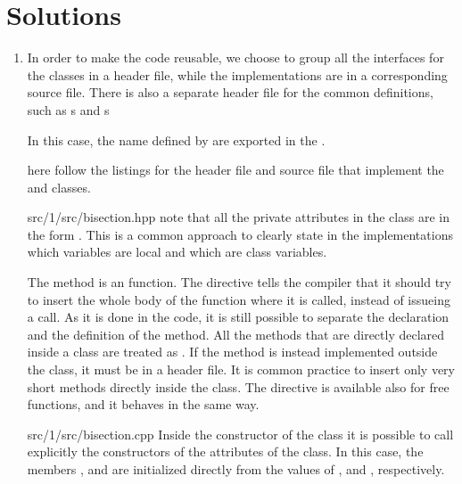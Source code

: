 \section*{Solutions}

\begin{enumerate}

    \item In order to make the code reusable, we choose to group all the
    interfaces for the classes in a header file, while the implementations are
    in a corresponding source file. There is also a separate header file for
    the common definitions, such as s and s

    \lstset{basicstyle=\scriptsize\sf}
    
    \lstset{basicstyle=\sf}

    In this case, the name defined by  are exported in the
     .

    here follow the listings for the header file and source file that implement
    the  and  classes.
    \lstset{basicstyle=\scriptsize\sf}
    
      {src/1/src/bisection.hpp}
    \lstset{basicstyle=\sf}
    note that all the private attributes in the class are in the form
    . This is a common approach to clearly state in the
    implementations which variables are local and which are class variables.

    The  method is an  function. The 
    directive tells the compiler that it should try to insert the whole body of
    the function where it is called, instead of issueing a call. As it is done
    in the code, it is still possible to separate the declaration and the
    definition of the method. All the methods that are directly declared inside
    a class are treated as . If the method is instead implemented
    outside the class, it must be in a header file. It is common practice to
    insert only very short methods directly inside the class. The 
    directive is available also for free functions, and it behaves in the same
    way.
    \lstset{basicstyle=\scriptsize\sf}
    
    {src/1/src/bisection.cpp}
    \lstset{basicstyle=\sf}
    Inside the constructor of the class it is possible to call explicitly the
    constructors of the attributes of the class. In this case, the members 
    ,  and  are initialized directly from
    the values of ,  and , respectively.


\end{enumerate}
